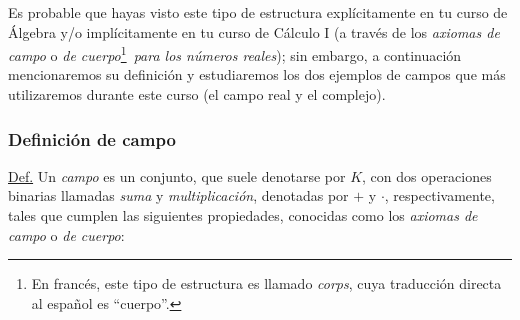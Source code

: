 \documentclass[apuntes]{subfiles}
\begin{document}
Es probable que hayas visto este tipo de estructura explícitamente en tu curso de Álgebra y/o implícitamente en tu curso de Cálculo I (a través de los \emph{axiomas de campo} \textemdash o \emph{de cuerpo}\footnote{En francés, este tipo de estructura es llamado \emph{corps}, cuya traducción directa al español es ``cuerpo''.}\textemdash \ \emph{para los números reales}); sin embargo, a continuación mencionaremos su definición y estudiaremos los dos ejemplos de campos que más utilizaremos durante este curso (el campo real y el complejo).

\subsubsection*{Definición de campo} \label{Sssec: Definición de campo}

\begin{tcolorbox}[breakable]
    \underline{Def.} Un \emph{campo} es un conjunto, que suele denotarse por $K$, con dos operaciones binarias llamadas \emph{suma} y \emph{multiplicación}, denotadas por $+$ y $\cdot$, respectivamente, tales que cumplen las siguientes propiedades, conocidas como los \emph{axiomas de campo} o \emph{de cuerpo}:


\end{tcolorbox}
\end{document}
